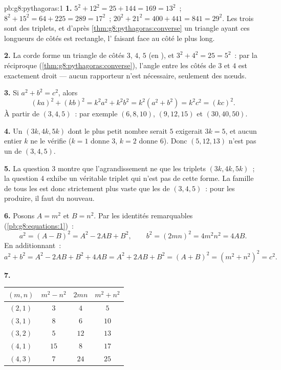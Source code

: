 \begin{solution}{pb:g8:pythagoras:1}
\textbf{1.} $5^2 + 12^2 = 25 + 144 = 169 = 13^2$~; \quad
$8^2 + 15^2 = 64 + 225 = 289 = 17^2$~; \quad
$20^2 + 21^2 = 400 + 441 = 841 = 29^2$. Les trois sont des
triplets, et d'après \cref{thm:g8:pythagoras:converse} un triangle
ayant ces longueurs de côtés est rectangle, l' faisant
face au côté le plus long.

\textbf{2.} La corde forme un triangle de côtés $3$, $4$, $5$ (en
), et $3^2 + 4^2 = 25 = 5^2$~: par la réciproque
(\cref{thm:g8:pythagoras:converse}), l'angle entre les côtés de $3$
et $4$  est exactement droit --- aucun rapporteur n'est
nécessaire, seulement des nœuds.

\textbf{3.} Si $a^2 + b^2 = c^2$, alors
\[
(ka)^2 + (kb)^2 = k^2 a^2 + k^2 b^2
= k^2\left(a^2 + b^2\right) = k^2 c^2 = (kc)^2 .
\]
À partir de $(3, 4, 5)$~: par exemple $(6, 8, 10)$, $(9, 12, 15)$
et $(30, 40, 50)$.

\textbf{4.} Un  $(3k, 4k, 5k)$ dont le plus petit nombre
serait $5$ exigerait $3k = 5$, et aucun entier $k$ ne le vérifie
($k = 1$ donne $3$, $k = 2$ donne $6$). Donc $(5, 12, 13)$ n'est pas
un  de $(3, 4, 5)$.

\textbf{5.} La question 3 montre que l'agrandissement ne  que
les triplets $(3k, 4k, 5k)$~; la question 4 exhibe un véritable
triplet qui n'est pas de cette forme. La famille de tous les
 est donc strictement plus vaste que les
 de $(3, 4, 5)$~: pour les produire, il faut du nouveau.

\textbf{6.} Posons $A = m^2$ et $B = n^2$. Par les identités
remarquables (\cref{pb:g8:equations:1})~:
\[
a^2 = (A - B)^2 = A^2 - 2AB + B^2,
\qquad
b^2 = (2mn)^2 = 4m^2n^2 = 4AB .
\]
En additionnant~:
\[
a^2 + b^2 = A^2 - 2AB + B^2 + 4AB
= A^2 + 2AB + B^2 = (A + B)^2
= \left(m^2 + n^2\right)^2 = c^2 .
\]

\textbf{7.}
\begin{center}
\renewcommand{\arraystretch}{1.2}
\begin{tabular}{c|ccc}
$(m, n)$ & $m^2 - n^2$ & $2mn$ & $m^2 + n^2$ \\
\hline
$(2, 1)$ & $3$ & $4$ & $5$ \\
$(3, 1)$ & $8$ & $6$ & $10$ \\
$(3, 2)$ & $5$ & $12$ & $13$ \\
$(4, 1)$ & $15$ & $8$ & $17$ \\
$(4, 3)$ & $7$ & $24$ & $25$ \\
\end{tabular}
\end{center}


\end{solution}
